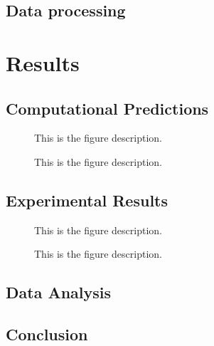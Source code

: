 \documentclass[oneside, astronomy, noacknowlegments]{BYUPhys}
\begin{document}
\section{Data processing}










\chapter{Results}

\section{Computational Predictions}

\begin{figure}
    \caption[ODMR computational model for SiC]{\label{fig:SiCModel}
     This is the figure description.}
 \end{figure}

\begin{figure}
    \caption[ODMR computational model for CdTe]{\label{fig:CdTeModel}
     This is the figure description.}
 \end{figure}

\section{Experimental Results}

\begin{figure}
    \caption[Experimental ODMR for SiC]{\label{fig:SiCResults}
     This is the figure description.}
 \end{figure}

\begin{figure}
    \caption[Experimental ODMR for CdTe]{\label{fig:CdTeResults}
     This is the figure description.}
 \end{figure}


\section{Data Analysis}

\section{Conclusion}
\end{document}
